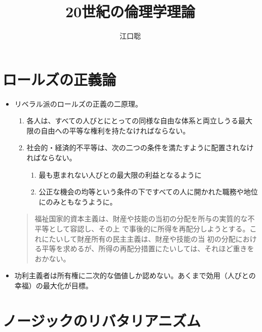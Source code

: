 \documentclass[]{jsarticle}
\author{江口聡}
\title{20世紀の倫理学理論}
\begin{document}
\maketitle

\section{ロールズの正義論}

\begin{itemize}
\item リベラル派のロールズの正義の二原理。

  \begin{enumerate}
  \item 各人は、すべての人びとにとっての同様な自由な体系と両立しうる最大限の自由への平等な権利を持たなければならない。
  \item 社会的・経済的不平等は、次の二つの条件を満たすように配置されなければならない。
    \begin{enumerate}
    \item 最も恵まれない人びとの最大限の利益となるように
    \item 公正な機会の均等という条件の下ですべての人に開かれた職務や地位にのみともなうように。
    \end{enumerate}
  \end{enumerate}

  \begin{quote}
    福祉国家的資本主義は、財産や技能の当初の分配を所与の実質的な不平等として容認し、その上
    で事後的に所得を再配分しようとする。これにたいして財産所有の民主主義は、財産や技能の当
    初の分配における平等を求めるが、所得の再配分措置にたいしては、それほど重きをおかない。
  \end{quote}

\item 功利主義者は所有権に二次的な価値しか認めない。あくまで効用（人びとの幸福）の最大化が目標。

\end{itemize}
\section{ノージックのリバタリアニズム}
\end{document}
